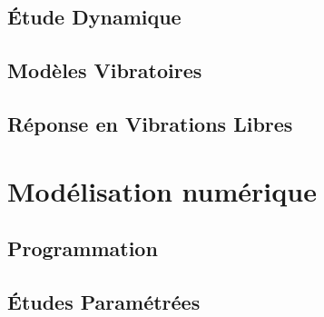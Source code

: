 \documentclass[a4paper,10pt]{report} %
\begin{document}
\section{Étude Dynamique}
\section{Modèles Vibratoires}
\section{Réponse en Vibrations Libres}
\chapter{Modélisation numérique}
\section{Programmation}
\section{Études Paramétrées}
















	
\end{document}
